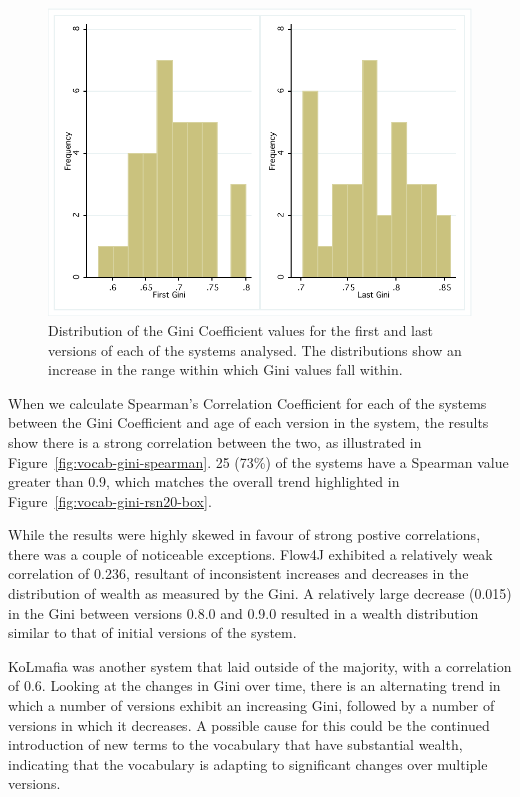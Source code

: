\begin{figure}[t]
\centering
\includegraphics[width=\textwidth]{Figures/Vocab-FirstLastGini.pdf}
\caption{Distribution of the Gini Coefficient values for the first and last versions of each of the systems analysed. The distributions show an increase in the range within which Gini values fall within.}
\label{fig:vocab-firstlastgini-dist}
\end{figure}

When we calculate Spearman's Correlation Coefficient for each of the systems between the Gini  Coefficient and age of each version in the system, the results show there is a strong correlation between the two, as illustrated in Figure~\ref{fig:vocab-gini-spearman}. 25 (73\%) of the systems have a Spearman value greater than 0.9, which matches the overall trend highlighted in Figure~\ref{fig:vocab-gini-rsn20-box}.

While the results were highly skewed in favour of strong postive correlations, there was a couple of noticeable exceptions. Flow4J exhibited a relatively weak correlation of 0.236, resultant of inconsistent increases and decreases in the distribution of wealth as measured by the Gini. A relatively large decrease (0.015) in the Gini between versions 0.8.0 and 0.9.0 resulted in a wealth distribution similar to that of initial versions of the system.

KoLmafia was another system that laid outside of the majority, with a correlation of 0.6. Looking at the changes in Gini over time, there is an alternating trend in which a number of versions exhibit an increasing Gini, followed by a number of versions in which it decreases. A possible cause for this could be the continued introduction of new terms to the vocabulary that have substantial wealth, indicating that the vocabulary is adapting to significant changes over multiple versions.

